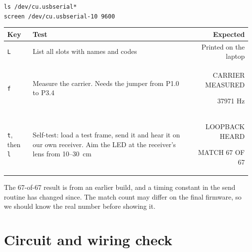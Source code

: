\documentclass[11pt,a4paper]{article}
\newcommand{\code}[1]{\texttt{#1}}
\newcommand{\lcd}[2]{{\setlength{\fboxsep}{2.5pt}\colorbox{lcdbg}{\parbox{2.25cm}{\raggedright\ttfamily\scriptsize\strut #1\\\strut #2}}}}
\begin{document}
\begin{center}
\code{ls /dev/cu.usbserial*}\\
\code{screen /dev/cu.usbserial-10 9600}
\end{center}

\begin{center}
\small
\begin{tabularx}{\textwidth}{@{}l L D@{}}
\toprule
Key & Test & Expected\\
\midrule
\code{L} & List all slots with names and codes & Printed on the laptop\\
\code{f} & Measure the carrier. Needs the jumper from P1.0 to P3.4 & \lcd{CARRIER MEASURED}{37971 Hz}\\
\code{t}, then \code{l} & Self-test: load a test frame, send it and hear it on our own receiver. Aim the LED at the receiver's lens from 10--\qty{30}{\centi\metre} & \lcd{LOOPBACK HEARD}{MATCH 67 OF 67}\\
\bottomrule
\end{tabularx}
\end{center}

The 67-of-67 result is from an earlier build, and a timing constant in the send routine has changed since. The match count may differ on the final firmware, so we should know the real number before showing it.

\newpage
\section{Circuit and wiring check}
\end{document}
